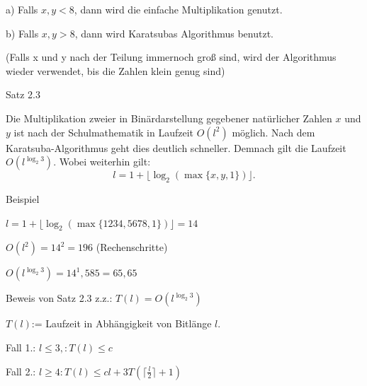 \documentclass[10pt]{beamer}
\begin{document}
\begin{frame}
    a) Falls $x, y < 8$, dann wird die einfache Multiplikation genutzt.


b) Falls $x, y > 8$, dann wird Karatsubas Algorithmus benutzt.


\vspace{0.5cm}

(Falls x und y nach der Teilung immernoch groß sind, wird der Algorithmus wieder verwendet, bis die Zahlen klein genug sind)

\end{frame}


\begin{frame}{Satz 2.3}

Die Multiplikation zweier in Binärdarstellung gegebener natürlicher Zahlen $x$ und $y$ ist nach der Schulmathematik in Laufzeit $O(l^2)$ möglich. Nach dem Karatsuba-Algorithmus geht dies deutlich schneller. Demnach gilt die Laufzeit $O\left(l^{\log_2 3}\right)$. Wobei weiterhin gilt:
\[
l = 1 + \lfloor \log_2(\max\{x, y, 1\}) \rfloor.
\]
    
\end{frame}

\begin{frame}{Beispiel}

$l = 1 + \lfloor \log_2(\max\{1234, 5678, 1\}) \rfloor = 14$

 $O(l^2)=14^2= 196$ (Rechenschritte)
 
 $O\left(l^{\log_2 3}\right)= 14^1,585= 65,65$

    
\end{frame}

\begin{frame}{Beweis von Satz 2.3}
    z.z.: $T(l) = O\left(l^{\log_2 3}\right)$

\vspace{0.2cm}
$T(l)$:= Laufzeit in Abhängigkeit von Bitlänge $l$. 


\vspace{0.3cm}
\noindent Fall 1.:  $ l \leq 3,: T(l) \leq c$

\vspace{0.3cm}
\noindent Fall 2.: $l \geq 4: T(l) \leq cl+ 3T (\lceil \frac{l}{2} \rceil +1) $

\vspace{0.7cm}

\end{frame}  
\end{document}
